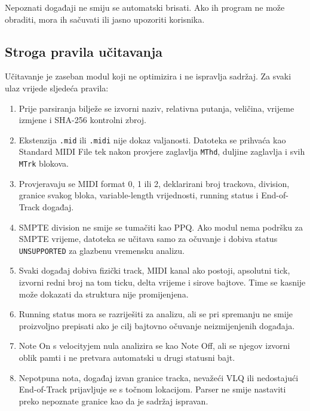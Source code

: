 \documentclass[11pt]{article}
\begin{document}
Nepoznati događaji ne smiju se automatski brisati. Ako ih program ne može
obraditi, mora ih sačuvati ili jasno upozoriti korisnika.

\subsection{Stroga pravila učitavanja}

Učitavanje je zaseban modul koji ne optimizira i ne ispravlja sadržaj. Za svaki
ulaz vrijede sljedeća pravila:

\begin{enumerate}[label=L\arabic*.]
    \item Prije parsiranja bilježe se izvorni naziv, relativna putanja,
    veličina, vrijeme izmjene i SHA-256 kontrolni zbroj.

    \item Ekstenzija \texttt{.mid} ili \texttt{.midi} nije dokaz valjanosti.
    Datoteka se prihvaća kao Standard MIDI File tek nakon provjere zaglavlja
    \texttt{MThd}, duljine zaglavlja i svih \texttt{MTrk} blokova.

    \item Provjeravaju se MIDI format 0, 1 ili 2, deklarirani broj trackova,
    division, granice svakog bloka, variable-length vrijednosti, running
    status i End-of-Track događaj.

    \item SMPTE division ne smije se tumačiti kao PPQ. Ako modul nema podršku
    za SMPTE vrijeme, datoteka se učitava samo za očuvanje i dobiva status
    \texttt{UNSUPPORTED} za glazbenu vremensku analizu.

    \item Svaki događaj dobiva fizički track, MIDI kanal ako postoji,
    apsolutni tick, izvorni redni broj na tom ticku, delta vrijeme i sirove
    bajtove. Time se kasnije može dokazati da struktura nije promijenjena.

    \item Running status mora se razriješiti za analizu, ali se pri spremanju
    ne smije proizvoljno prepisati ako je cilj bajtovno očuvanje neizmijenjenih
    događaja.

    \item Note On s velocityjem nula analizira se kao Note Off, ali se njegov
    izvorni oblik pamti i ne pretvara automatski u drugi statusni bajt.

    \item Nepotpuna nota, događaj izvan granice tracka, nevažeći VLQ ili
    nedostajući End-of-Track prijavljuje se s točnom lokacijom. Parser ne smije
    nastaviti preko nepoznate granice kao da je sadržaj ispravan.


\end{enumerate}
\end{document}
